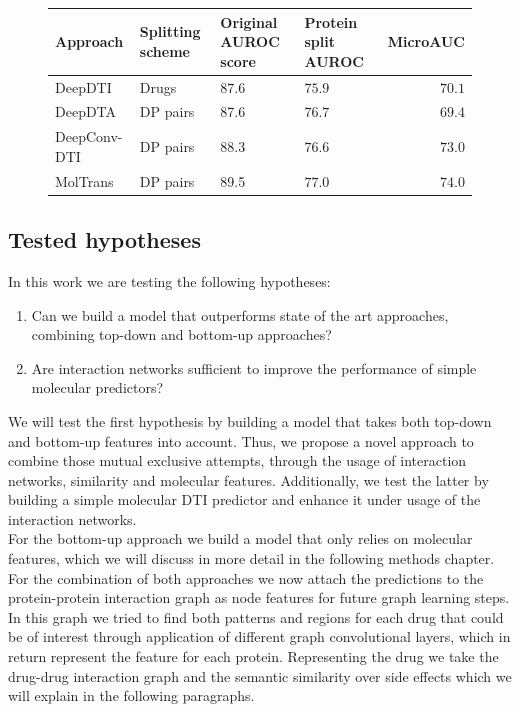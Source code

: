 \documentclass{bioinfo}
\begin{document}
\begin{figure}[!tpb]%
	\begin{tabular}{|l|p{1cm}|p{1cm}|p{1cm}|r|}
		\hline
		Approach&Splitting scheme&Original AUROC score&Protein split AUROC&MicroAUC\\
		\hline
		DeepDTI&Drugs&$87.6$&$75.9$&$70.1$\\
		DeepDTA&DP pairs&87.6&$76.7$&$69.4$\\
		DeepConv-DTI&DP pairs&88.3&$76.6$&$73.0$\\
		MolTrans&DP pairs&89.5&$77.0$&$74.0$\\
		
		\hline
	\end{tabular}
\end{figure}



\subsection{Tested hypotheses}

In this work we are testing the following hypotheses:
\begin{enumerate}
	\item Can we build a model that outperforms state of the art approaches, combining top-down and bottom-up approaches?
	\item Are interaction networks sufficient to improve the performance of simple molecular predictors?
\end{enumerate}
We will test the first hypothesis by building a model that takes both top-down and bottom-up features into account. Thus, we propose a novel approach to combine those mutual exclusive attempts, through the usage of interaction networks, similarity and molecular features. Additionally, we test the latter by building a simple molecular DTI predictor and enhance it under usage of the interaction networks.\\

For the bottom-up approach we build a model that only relies on molecular features, which we will discuss in more detail in the following methods chapter. For the combination of both approaches we now attach the predictions to the protein-protein interaction graph as node features for future graph learning steps. In this graph we tried to find both patterns and regions for each drug that could be of interest through application of different graph convolutional layers, which in return represent the feature for each protein. Representing the drug we take the drug-drug interaction graph and the semantic similarity over side effects which we will explain in the following paragraphs.
\end{document}

